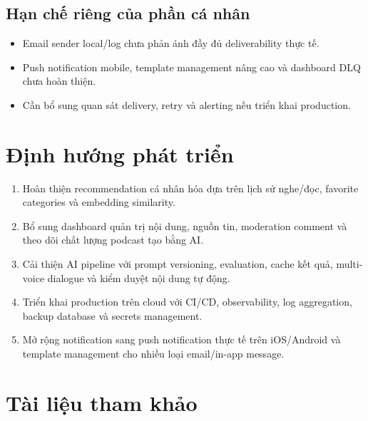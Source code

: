 \documentclass[14pt,a4paper,oneside]{extreport}
\begin{document}
\subsection{Hạn chế riêng của phần cá nhân}

\begin{itemize}[leftmargin=2cm]
  \item Email sender local/log chưa phản ánh đầy đủ deliverability thực tế.
  \item Push notification mobile, template management nâng cao và dashboard DLQ chưa hoàn thiện.
  \item Cần bổ sung quan sát delivery, retry và alerting nếu triển khai production.
\end{itemize}

\section{Định hướng phát triển}
\label{sec:dinh-huong}

\begin{enumerate}[leftmargin=2cm]
  \item Hoàn thiện recommendation cá nhân hóa dựa trên lịch sử nghe/đọc, favorite categories và embedding similarity.
  \item Bổ sung dashboard quản trị nội dung, nguồn tin, moderation comment và theo dõi chất lượng podcast tạo bằng AI.
  \item Cải thiện AI pipeline với prompt versioning, evaluation, cache kết quả, multi-voice dialogue và kiểm duyệt nội dung tự động.
  \item Triển khai production trên cloud với CI/CD, observability, log aggregation, backup database và secrets management.
  \item Mở rộng notification sang push notification thực tế trên iOS/Android và template management cho nhiều loại email/in-app message.
\end{enumerate}

\section{Tài liệu tham khảo}
\label{sec:tai-lieu-tham-khao}
\end{document}
